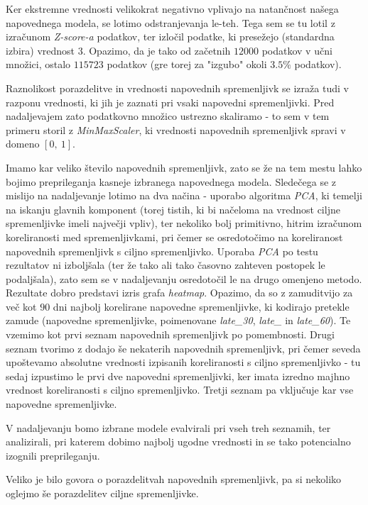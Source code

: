 \documentclass{article}
\begin{document}
Ker ekstremne vrednosti velikokrat negativno vplivajo na natančnost našega napovednega modela, se lotimo odstranjevanja le-teh. 
Tega sem se tu lotil z izračunom \textit{Z-score-a} podatkov, ter izločil podatke, ki presežejo (standardna izbira) vrednost $3$.
Opazimo, da je tako od začetnih $12000$ podatkov v učni množici, ostalo $115723$ podatkov (gre torej za "izgubo" okoli $3.5 \%$ podatkov).

Raznolikost porazdelitve in vrednosti napovednih spremenljivk se izraža tudi v razponu vrednosti, ki jih je zaznati pri vsaki napovedni spremenljivki.
Pred nadaljevajem zato podatkovno množico ustrezno skaliramo - to sem v tem primeru storil z \textit{MinMaxScaler}, ki vrednosti napovednih spremenljivk spravi v domeno $[0,~1]$.

Imamo kar veliko število napovednih spremenljivk, zato se že na tem mestu lahko bojimo preprileganja kasneje izbranega napovednega modela. 
Sledečega se z mislijo na nadaljevanje lotimo na dva načina - uporabo algoritma \textit{PCA}, ki temelji na iskanju glavnih komponent (torej tistih, ki bi načeloma na vrednost ciljne spremenljivke imeli največji vpliv), ter nekoliko bolj primitivno, hitrim izračunom koreliranosti med spremenljivkami, pri čemer se osredotočimo na koreliranost napovednih spremenljivk s ciljno spremenljivko. 
Uporaba \textit{PCA} po testu rezultatov ni izboljšala (ter že tako ali tako časovno zahteven postopek le podaljšala), zato sem se v nadaljevanju osredotočil le na drugo omenjeno metodo. 
Rezultate dobro predstavi izris grafa \textit{heatmap}. Opazimo, da so z zamuditvijo za več kot $90$ dni najbolj korelirane napovedne spremenljivke, ki kodirajo pretekle zamude (napovedne spremenljivke, poimenovane \textit{late\_30}, \textit{late\_} in \textit{late\_60}).
Te vzemimo kot prvi seznam napovednih spremenljivk po pomembnosti. 
Drugi seznam tvorimo z dodajo še nekaterih napovednih spremenljivk, pri čemer seveda upoštevamo absolutne vrednosti izpisanih koreliranosti s ciljno spremenljivko - tu sedaj izpustimo le prvi dve napovedni spremenljivki, ker imata izredno majhno vrednost koreliranosti s ciljno spremenljivko.  
Tretji seznam pa vključuje kar vse napovedne spremenljivke.

V nadaljevanju bomo izbrane modele evalvirali pri vseh treh seznamih, ter analizirali, pri katerem dobimo najbolj ugodne vrednosti in se tako potencialno izognili preprileganju.

Veliko je bilo govora o porazdelitvah napovednih spremenljivk, pa si nekoliko oglejmo še porazdelitev ciljne spremenljivke. 
\end{document}
